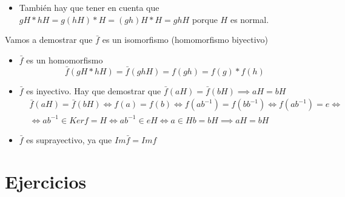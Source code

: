 \documentclass[a4paper,12pt]{article}
\begin{document}
\begin{enumerate}
\begin{itemize}
        \item También hay que tener en cuenta que $gH * hH = g(hH) * H = (gh)H * H = ghH$ porque $H$ es normal.
    \end{itemize}
    
    Vamos a demostrar que $\bar{f}$ es un isomorfismo (homomorfismo biyectivo)
    
    \begin{itemize}

        \item $\bar{f}$ es un homomorfismo
        $$
        \bar{f}(gH * hH) = \bar{f}(ghH) = f(gh) = f(g)*f(h)
        $$

        \item $\bar{f}$ es inyectivo. Hay que demostrar que $\bar{f}(aH) = \bar{f}(bH) \implies aH = bH$
        \begin{equation*}
            \begin{split}
                & \bar{f}(aH) = \bar{f}(bH) \iff f(a) = f(b) \iff f(ab^{-1}) = f(bb^{-1}) \iff f(ab^{-1}) = e \iff\\
                & \iff ab^{-1} \in Kerf = H \iff ab^{-1} \in eH \iff a \in Hb = bH \implies aH = bH  
            \end{split}
        \end{equation*}

    \item $\bar{f}$ es suprayectivo, ya que $Im \bar{f} = Imf$ 
    \end{itemize}
\end{enumerate}

\pagebreak

\section*{Ejercicios}
\end{document}
